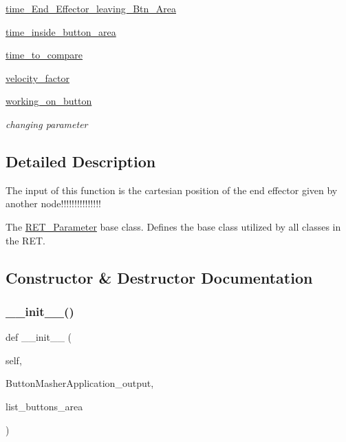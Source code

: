 \begin{DoxyCompactItemize}
\item 
\hyperlink{classRET__Parameter_1_1RET__Parameter_ab4ac422d38097f009ddb2c18a4172740}{time\+\_\+\+End\+\_\+\+Effector\+\_\+leaving\+\_\+\+Btn\+\_\+\+Area}
\item 
\hyperlink{classRET__Parameter_1_1RET__Parameter_ac753e4e4f67db35f3e3a49d6e329cd1a}{time\+\_\+inside\+\_\+button\+\_\+area}
\item 
\hyperlink{classRET__Parameter_1_1RET__Parameter_a87b98641af9ca1313ac09b85bff4c3bb}{time\+\_\+to\+\_\+compare}
\item 
\hyperlink{classRET__Parameter_1_1RET__Parameter_a082e6ba9804a6094336b4c267262460e}{velocity\+\_\+factor}
\item 
\hyperlink{classRET__Parameter_1_1RET__Parameter_a96204c1a4417d5a3a980521f8a66a1fa}{working\+\_\+on\+\_\+button}
\begin{DoxyCompactList}\small\item\em changing parameter \end{DoxyCompactList}\end{DoxyCompactItemize}


\subsection{Detailed Description}
The input of this function is the cartesian position of the end effector given by another node!!!!!!!!!!!!!!! 

The \hyperlink{classRET__Parameter_1_1RET__Parameter}{R\+E\+T\+\_\+\+Parameter} base class. Defines the base class utilized by all classes in the R\+ET. 

\subsection{Constructor \& Destructor Documentation}
\mbox{\label{classRET__Parameter_1_1RET__Parameter_acaff5a3a7b875ffce45f9c16a3f191d6}} 
\subsubsection{\texorpdfstring{\+\_\+\+\_\+init\+\_\+\+\_\+()}{\_\_init\_\_()}}
{\footnotesize\ttfamily def \+\_\+\+\_\+init\+\_\+\+\_\+ (\begin{DoxyParamCaption}\item[{}]{self,  }\item[{}]{Button\+Masher\+Application\+\_\+output,  }\item[{}]{list\+\_\+buttons\+\_\+area }\end{DoxyParamCaption})}



